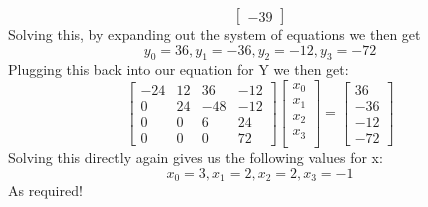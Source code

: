 \documentclass[12pt]{article}
\begin{document}
\begin{adjustwidth}{0em}{0pt}
\[\begin{bmatrix}
-39
\end{bmatrix}\]
Solving this, by expanding out the system of equations we then get
\[ y_0 = 36, y_1 = -36, y_2 = -12, y_3 = -72 \]
Plugging this back into our equation for Y we then get:
\[ 
\begin{bmatrix}
-24 & 12 & 36 & -12\\
0 & 24 & -48 & -12\\
0 & 0 & 6 & 24\\
0 & 0 & 0 & 72
\end{bmatrix}
\begin{bmatrix}
x_0 \\
x_1 \\
x_2 \\
x_3 \\
\end{bmatrix}
=
\begin{bmatrix}
36 \\
-36 \\
-12 \\
-72
\end{bmatrix}\]
Solving this directly again gives us the following values for x:
\[ x_0 = 3, x_1 = 2, x_2 = 2, x_3 = -1 \]
As required!
\end{adjustwidth}
\end{document}
